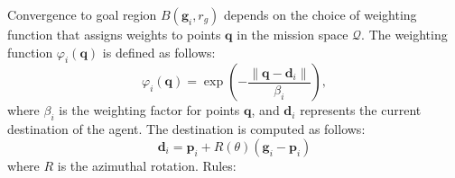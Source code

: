         Convergence to goal region $B(\mathbf{g}_i, r_g )$ depends on the choice of weighting function that assigns weights to points $\mathbf{q}$ in the mission space $\mathcal{Q}$.
        The weighting function $\varphi_i(\mathbf{q})$ is defined as follows: 
        \begin{equation}
            \varphi_i(\mathbf{q}) = \exp\left(-\frac{\|\mathbf{q} - \mathbf{d}_i\|}{\beta_i}\right),
        \end{equation}
        where $\beta_i$ is the weighting factor for points $\mathbf{q}$, and $\mathbf{d}_i$ represents the current destination of the agent. 
        The destination is computed as follows:
        \begin{equation}
            \mathbf{d}_i = \mathbf{p}_i + R(\theta)(\mathbf{g}_i - \mathbf{p}_i)
        \end{equation}
        where $R$ is the azimuthal rotation.
        Rules: 
